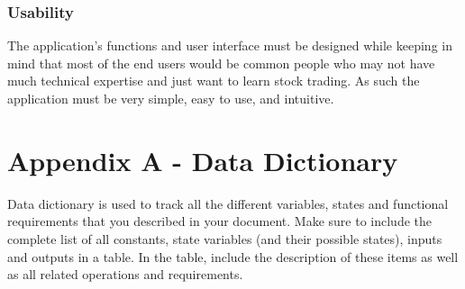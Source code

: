 \documentclass[12 pt, a4paper]{report}
\begin{document}
	\subsection{Usability}
	The application's functions and user interface must be designed while keeping in mind that most of the end users would be common people who may not have much technical expertise and just want to learn stock trading. As such the application must be very simple, easy to use, and intuitive.
		
		
	\chapter {Appendix A - Data Dictionary}
	Data dictionary is used to track all the different variables, states and functional requirements that you described in your document. Make sure to include the complete list of all constants, state variables (and their possible states), inputs and outputs in a table. In the table, include the description of these items as well as all related operations and requirements.
		
	
\end{document}
